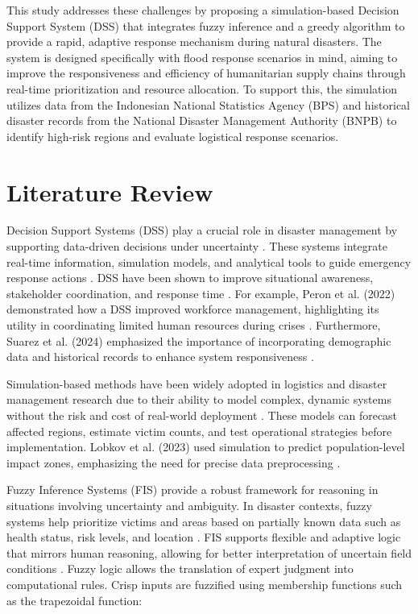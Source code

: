 \documentclass[conference,final,a4paper,twoside,10pt]{IEEEtran}
\begin{document}
This study addresses these challenges by proposing a simulation-based Decision Support System (DSS) that integrates fuzzy inference and a greedy algorithm to provide a rapid, adaptive response mechanism during natural disasters. The system is designed specifically with flood response scenarios in mind, aiming to improve the responsiveness and efficiency of humanitarian supply chains through real-time prioritization and resource allocation. To support this, the simulation utilizes data from the Indonesian National Statistics Agency (BPS) and historical disaster records from the National Disaster Management Authority (BNPB) to identify high-risk regions and evaluate logistical response scenarios.

\section{Literature Review}

Decision Support Systems (DSS) play a crucial role in disaster management by supporting data-driven decisions under uncertainty \cite{khan2023systematic}. These systems integrate real-time information, simulation models, and analytical tools to guide emergency response actions \cite{alghodhaifi2021autonomous}. DSS have been shown to improve situational awareness, stakeholder coordination, and response time \cite{adetiloye2021collaboration}. For example, Peron et al. (2022) demonstrated how a DSS improved workforce management, highlighting its utility in coordinating limited human resources during crises \cite{peron2022decision}. Furthermore, Suarez et al. (2024) emphasized the importance of incorporating demographic data and historical records to enhance system responsiveness \cite{suarez2024integrated}.

Simulation-based methods have been widely adopted in logistics and disaster management research due to their ability to model complex, dynamic systems without the risk and cost of real-world deployment \cite{chang2022simulation}. These models can forecast affected regions, estimate victim counts, and test operational strategies before implementation. Lobkov et al. (2023) used simulation to predict population-level impact zones, emphasizing the need for precise data preprocessing \cite{lobkov2023determination}.

Fuzzy Inference Systems (FIS) provide a robust framework for reasoning in situations involving uncertainty and ambiguity. In disaster contexts, fuzzy systems help prioritize victims and areas based on partially known data such as health status, risk levels, and location \cite{anjomshoae2021integrated}. FIS supports flexible and adaptive logic that mirrors human reasoning, allowing for better interpretation of uncertain field conditions \cite{improta2020fuzzy}.
Fuzzy logic allows the translation of expert judgment into computational rules. Crisp inputs are fuzzified using membership functions such as the trapezoidal function:
\end{document}
